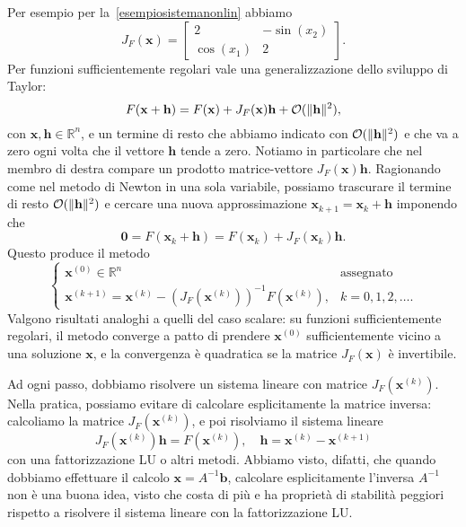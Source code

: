 \documentclass[a4paper]{report}
\DeclarePairedDelimiter{\norm}{\lVert}{\rVert}
\theoremstyle{definiton}
\theoremstyle{remark}
\newcommand{\x}{\mathbf{x}}
\renewcommand{\b}{\mathbf{b}}
\begin{document}
Per esempio per la~\eqref{esempiosistemanonlin} abbiamo
\[
J_F(\x) = \begin{bmatrix}
    2 & -\sin(x_2)\\
    \cos(x_1) & 2
\end{bmatrix}.
\]
Per funzioni sufficientemente regolari vale una generalizzazione dello sviluppo di Taylor:
\begin{equation} \label{taylormulti}
    F(\x+\mathbf{h}) = F(\x) + J_F(\x) \mathbf{h} + \mathcal{O}(\norm{\mathbf{h}}^2),
\end{equation}
con $\x,\mathbf{h} \in\mathbb{R}^n$, e un termine di resto che abbiamo indicato con $\mathcal{O}(\norm{\mathbf{h}}^2)$ e che va a zero ogni volta che il vettore $\mathbf{h}$ tende a zero. Notiamo in particolare che nel membro di destra compare un prodotto matrice-vettore $J_F(\x) \mathbf{h}$. Ragionando come nel metodo di Newton in una sola variabile, possiamo trascurare il termine di resto $\mathcal{O}(\norm{\mathbf{h}}^2)$ e cercare una nuova approssimazione $\x_{k+1} = \x_k+\mathbf{h}$ imponendo che
\[
    \mathbf{0} = F(\x_k+\mathbf{h}) = F(\x_k) + J_F(\x_k) \mathbf{h}.
\]
Questo produce il metodo
\[
\begin{cases}
\x^{(0)} \in \mathbb{R}^n & \text{assegnato}\\
\x^{(k+1)} = \x^{(k)} - \left(J_F(\x^{(k)})\right)^{-1} F(\x^{(k)}), & k=0,1,2,\dots.
\end{cases}
\]
Valgono risultati analoghi a quelli del caso scalare: su funzioni sufficientemente regolari, il metodo converge a patto di prendere $\x^{(0)}$ sufficientemente vicino a una soluzione $\x$, e la convergenza è quadratica se la matrice $J_F(\x)$ è invertibile. 

Ad ogni passo, dobbiamo risolvere un sistema lineare con matrice $J_F(\x^{(k)})$. Nella pratica, possiamo evitare di calcolare esplicitamente la matrice inversa: calcoliamo la matrice $J_F(\x^{(k)})$, e poi risolviamo il sistema lineare
\[
    J_F(\x^{(k)}) \mathbf{h} = F(\x^{(k)}), \quad \mathbf{h} = \x^{(k)} - \x^{(k+1)}
\]
con una fattorizzazione LU o altri metodi. Abbiamo visto, difatti, che quando dobbiamo effettuare il calcolo $\x = A^{-1}\b$, calcolare esplicitamente l'inversa $A^{-1}$ non è una buona idea, visto che costa di più e ha proprietà di stabilità peggiori rispetto a risolvere il sistema lineare con la fattorizzazione LU.
\end{document}
